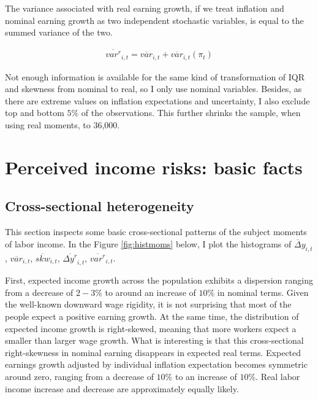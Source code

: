 \documentclass[12pt,notitlepage,onecolumn,aps,pra]{article}
\begin{document}
The variance associated with real earning growth, if we treat inflation
and nominal earning growth as two independent stochastic variables, is
equal to the summed variance of the two.

\begin{eqnarray}
\overline{var^{r}}_{i,t} = \overline{var}_{i,t} + \overline{var}_{i,t}(\pi_{t})
\end{eqnarray}

Not enough information is available for the same kind of transformation
of IQR and skewness from nominal to real, so I only use nominal
variables. Besides, as there are extreme values on inflation
expectations and uncertainty, I also exclude top and bottom \(5\%\) of
the observations. This further shrinks the sample, when using real
moments, to 36,000.

    \hypertarget{perceived-income-risks-basic-facts}{%
\section{Perceived income risks: basic
facts}\label{perceived-income-risks-basic-facts}}

\hypertarget{cross-sectional-heterogeneity}{%
\subsection{Cross-sectional
heterogeneity}\label{cross-sectional-heterogeneity}}

This section inspects some basic cross-sectional patterns of the subject
moments of labor income. In the Figure \ref{fig:histmoms} below, I plot
the histograms of \(\overline\Delta y_{i,t}\), \(\overline{var}_{i,t}\),
\(\overline {skw}_{i,t}\), \(\overline {\Delta y^{r}}_{i,t}\),
\(\overline{var^{r}}_{i,t}\).

First, expected income growth across the population exhibits a
dispersion ranging from a decrease of \(2-3\%\) to around an increase of
\(10\%\) in nominal terms. Given the well-known downward wage rigidity,
it is not surprising that most of the people expect a positive earning
growth. At the same time, the distribution of expected income growth is
right-skewed, meaning that more workers expect a smaller than larger
wage growth. What is interesting is that this cross-sectional
right-skewness in nominal earning disappears in expected real terms.
Expected earnings growth adjusted by individual inflation expectation
becomes symmetric around zero, ranging from a decrease of \(10\%\) to an
increase of \(10\%\). Real labor income increase and decrease are
approximately equally likely.
\end{document}
